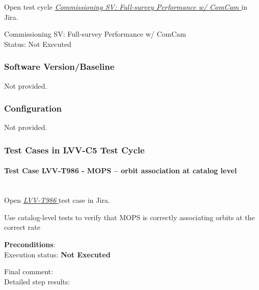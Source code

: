 \documentclass[DM,lsstdraft,STR,toc]{lsstdoc}
\begin{document}
Open test cycle {\it \href{https://jira.lsstcorp.org/secure/Tests.jspa#/testrun/LVV-C5}{Commissioning SV: Full-survey Performance w/ ComCam
}} in Jira.

  Commissioning SV: Full-survey Performance w/ ComCam
\\
  Status: Not Executed

  

  \subsubsection{Software Version/Baseline}
    Not provided.

  \subsubsection{Configuration}
    Not provided.

  \subsubsection{Test Cases in LVV-C5 Test Cycle}


    \paragraph{Test Case LVV-T986 - MOPS -- orbit association at catalog level
 }\mbox{}\\

Open  \href{https://jira.lsstcorp.org/secure/Tests.jspa#/testCase/LVV-T986}{\textit{ LVV-T986 } }
test case in Jira.

    Use catalog-level tests to verify that MOPS is correctly associating
orbits at the correct rate


    \textbf{ Preconditions}:\\
    

    Execution status: {\bf Not Executed }

    Final comment:\\


    Detailed step results:
\end{document}
